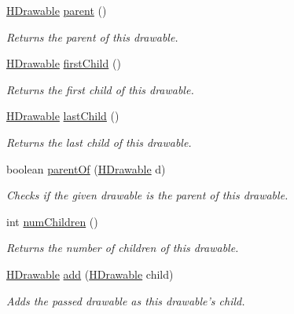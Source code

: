 \begin{DoxyCompactItemize}
\item 
\hyperlink{classhype_1_1core_1_1drawable_1_1_h_drawable}{H\-Drawable} \hyperlink{classhype_1_1core_1_1drawable_1_1_h_drawable_ae3e39365ae4a4efd3c1540bd428a630c}{parent} ()
\begin{DoxyCompactList}\small\item\em Returns the parent of this drawable. \end{DoxyCompactList}\item 
\hyperlink{classhype_1_1core_1_1drawable_1_1_h_drawable}{H\-Drawable} \hyperlink{classhype_1_1core_1_1drawable_1_1_h_drawable_a30494a50fd2a78b74994c93bef961d8c}{first\-Child} ()
\begin{DoxyCompactList}\small\item\em Returns the first child of this drawable. \end{DoxyCompactList}\item 
\hyperlink{classhype_1_1core_1_1drawable_1_1_h_drawable}{H\-Drawable} \hyperlink{classhype_1_1core_1_1drawable_1_1_h_drawable_a2fcc779fd97b24ef039c92cbc606717f}{last\-Child} ()
\begin{DoxyCompactList}\small\item\em Returns the last child of this drawable. \end{DoxyCompactList}\item 
boolean \hyperlink{classhype_1_1core_1_1drawable_1_1_h_drawable_ae833b7b6fb4a91bca96bfc122aba3010}{parent\-Of} (\hyperlink{classhype_1_1core_1_1drawable_1_1_h_drawable}{H\-Drawable} d)
\begin{DoxyCompactList}\small\item\em Checks if the given drawable is the parent of this drawable. \end{DoxyCompactList}\item 
int \hyperlink{classhype_1_1core_1_1drawable_1_1_h_drawable_a85a4ab0860a8c22e7f66d3da99f06940}{num\-Children} ()
\begin{DoxyCompactList}\small\item\em Returns the number of children of this drawable. \end{DoxyCompactList}\item 
\hyperlink{classhype_1_1core_1_1drawable_1_1_h_drawable}{H\-Drawable} \hyperlink{classhype_1_1core_1_1drawable_1_1_h_drawable_aed7c0ee67df070a2a260b75d32e2565a}{add} (\hyperlink{classhype_1_1core_1_1drawable_1_1_h_drawable}{H\-Drawable} child)
\begin{DoxyCompactList}\small\item\em Adds the passed drawable as this drawable's child. \end{DoxyCompactList}\item 

\end{DoxyCompactItemize}
